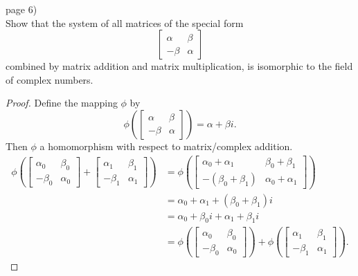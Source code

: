 \documentclass{article}
\newenvironment{problem}[2][Problem]{\begin{trivlist}
\item[\hskip \labelsep {\bfseries #1}\hskip \labelsep {\bfseries #2.}]}{\end{trivlist}}
\begin{document}
\pagebreak

\begin{problem}{1} (page 6) \\
  Show that the system of all matrices of the special form \[
    \begin{bmatrix}
      \alpha & \beta \\
      -\beta  & \alpha
    \end{bmatrix}
  \] combined by matrix addition and matrix multiplication, is isomorphic to the
  field of complex numbers.
\end{problem}

\begin{proof}
  Define the mapping $\phi$ by \[
    \phi\left(
      \begin{bmatrix}
        \alpha & \beta \\
        -\beta  & \alpha
      \end{bmatrix}
    \right) = \alpha + \beta i.
  \] Then $\phi$ a homomorphism with respect to matrix/complex addition.
  \begin{align*}
    \phi\left(\begin{bmatrix}
      \alpha_0 & \beta_0 \\
      -\beta_0  & \alpha_0
    \end{bmatrix} + \begin{bmatrix}
      \alpha_1 & \beta_1 \\
      -\beta_1  & \alpha_1
    \end{bmatrix}\right)
    &= \phi\left(\begin{bmatrix}
      \alpha_0 + \alpha_1 & \beta_0 + \beta_1 \\
      -(\beta_0 + \beta_1)  & \alpha_0 + \alpha_1
    \end{bmatrix}\right)\\
    &= \alpha_0 + \alpha_1 + (\beta_0 + \beta_1)i\\
    &= \alpha_0 + \beta_0i + \alpha_1 + \beta_1i\\
    &= \phi\left(\begin{bmatrix}
      \alpha_0 & \beta_0 \\
      -\beta_0  & \alpha_0
    \end{bmatrix}\right) + \phi\left(\begin{bmatrix}
      \alpha_1 & \beta_1 \\
      -\beta_1  & \alpha_1
    \end{bmatrix}\right).

\end{align*}
\end{proof}
\end{document}
